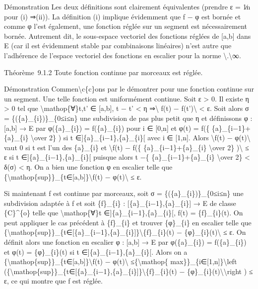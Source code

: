 \documentclass[]{article}
\begin{document}
Démonstration Les deux définitions sont clairement équivalentes (prendre
ε = 1∕n pour (i) ⇒(ii)). La définition (i) implique évidemment que f − φ
est bornée et comme φ l'est également, une fonction réglée sur un
segment est nécessairement bornée. Autrement dit, le sous-espace
vectoriel des fonctions réglées de {[}a,b{]} dans E (car il est
évidemment stable par combinaisons linéaires) n'est autre que
l'adhérence de l'espace vectoriel des fonctions en escalier pour la
norme \textbackslash{}\textbar{}.\textbackslash{}\textbar{}∞.

Théorème~9.1.2 Toute fonction continue par morceaux est réglée.

Démonstration Commen\textbackslash{}c\{c\}ons par le démontrer pour une
fonction continue sur un segment. Une telle fonction est uniformément
continue. Soit ε \textgreater{} 0. Il existe η \textgreater{} 0 tel que
\textbackslash{}mathop\{∀\}t,t' ∈ {[}a,b{]}, \textbar{}t − t'\textbar{}
\textless{} η ⇒\textbackslash{}\textbar{} f(t) −
f(t')\textbackslash{}\textbar{} \textless{} ε. Soit alors σ =
\{(\{a\}\_\{i\})\}\_\{0≤i≤n\} une subdivision de pas plus petit que η et
définissons φ : {[}a,b{]} → E par φ(\{a\}\_\{i\}) = f(\{a\}\_\{i\}) pour
i ∈ {[}0,n{]} et φ(t) = f(\{ \{a\}\_\{i−1\}+\{a\}\_\{i\}
\textbackslash{}over 2\} ) si t ∈{]}\{a\}\_\{i−1\},\{a\}\_\{i\}{[} avec
i ∈ {[}1,n{]}. Alors \textbackslash{}\textbar{}f(t) −
φ(t)\textbackslash{}\textbar{} vaut 0 si t est l'un des \{a\}\_\{i\} et
\textbackslash{}\textbar{}f(t) − f(\{ \{a\}\_\{i−1\}+\{a\}\_\{i\}
\textbackslash{}over 2\} )\textbackslash{}\textbar{} ≤ ε si t
∈{]}\{a\}\_\{i−1\},\{a\}\_\{i\}{[} puisque alors \textbar{}t −\{
\{a\}\_\{i−1\}+\{a\}\_\{i\} \textbackslash{}over 2\} \textbar{}
\textless{} δ(σ) \textless{} η. On a bien une fonction φ en escalier
telle que
\{\textbackslash{}mathop\{sup\}\}\_\{t∈{[}a,b{]}\}\textbackslash{}\textbar{}f(t)
− φ(t)\textbackslash{}\textbar{} ≤ ε.

Si maintenant f est continue par morceaux, soit σ =
\{(\{a\}\_\{i\})\}\_\{0≤i≤n\} une subdivision adaptée à f et soit
\{f\}\_\{i\} : {[}\{a\}\_\{i−1\},\{a\}\_\{i\}{]} → E de classe
\{C\}\^{}\{o\} telle que \textbackslash{}mathop\{∀\}t
∈{]}\{a\}\_\{i−1\},\{a\}\_\{i\}{[}, f(t) = \{f\}\_\{i\}(t). On peut
appliquer le cas précédent à \{f\}\_\{i\} et trouver \{φ\}\_\{i\} en
escalier telle que
\{\textbackslash{}mathop\{sup\}\}\_\{t∈{[}\{a\}\_\{i−1\},\{a\}\_\{i\}{]}\}\textbackslash{}\textbar{}\{f\}\_\{i\}(t)
− \{φ\}\_\{i\}(t)\textbackslash{}\textbar{} ≤ ε. On définit alors une
fonction en escalier φ : {[}a,b{]} → E par φ(\{a\}\_\{i\}) =
f(\{a\}\_\{i\}) et φ(t) = \{φ\}\_\{i\}(t) si t
∈{]}\{a\}\_\{i−1\},\{a\}\_\{i\}{[}. Alors on a
\{\textbackslash{}mathop\{sup\}\}\_\{t∈{[}a,b{]}\}\textbackslash{}\textbar{}f(t)
− φ(t)\textbackslash{}\textbar{} ≤\{\textbackslash{}mathop\{
max\}\}\_\{i∈{[}1,n{]}\}\textbackslash{}left
(\{\textbackslash{}mathop\{sup\}\}\_\{t∈{[}\{a\}\_\{i−1\},\{a\}\_\{i\}{]}\}\textbackslash{}\textbar{}\{f\}\_\{i\}(t)
− \{φ\}\_\{i\}(t)\textbackslash{}\textbar{}\textbackslash{}right ) ≤ ε,
ce qui montre que f est réglée.
\end{document}
